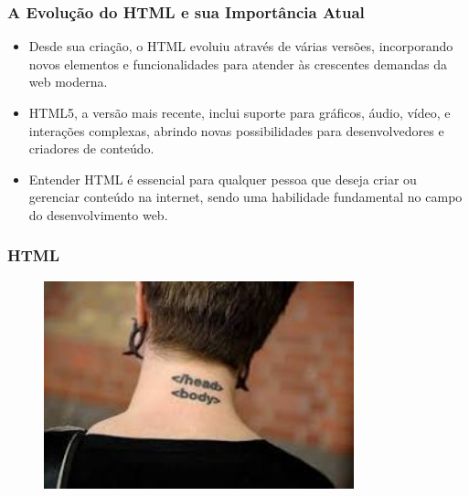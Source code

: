 \begin{frame}[fragile]
  \frametitle{A Evolução do HTML e sua Importância Atual}
  \begin{itemize}
    \item Desde sua criação, o HTML evoluiu através de várias versões, incorporando novos elementos e funcionalidades para atender às crescentes demandas da web moderna.
    \item HTML5, a versão mais recente, inclui suporte para gráficos, áudio, vídeo, e interações complexas, abrindo novas possibilidades para desenvolvedores e criadores de conteúdo.
    \item Entender HTML é essencial para qualquer pessoa que deseja criar ou gerenciar conteúdo na internet, sendo uma habilidade fundamental no campo do desenvolvimento web.
  \end{itemize}
\end{frame}
\begin{frame}[fragile]
  \frametitle{HTML}
  \begin{figure}
    \centering
    \includegraphics[width=0.8\textwidth]{assets/tatoo.jpeg}
  \end{figure}
\end{frame}

